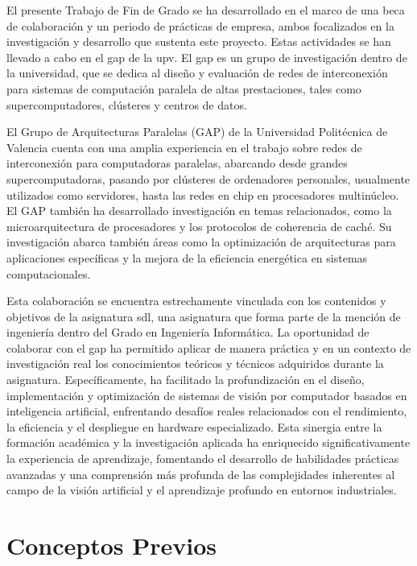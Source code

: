 \documentclass[11pt,spanish,listoffigures,listoftables]{tfgetsinf}
\begin{document}
El presente Trabajo de Fin de Grado se ha desarrollado en el marco de una beca de colaboración y un periodo de prácticas de empresa, ambos focalizados en la investigación y desarrollo que sustenta este proyecto. Estas actividades se han llevado a cabo en el \gls{gap} de la \gls{upv}. El \gls{gap} es un grupo de investigación dentro de la universidad, que se dedica al diseño y evaluación de redes de interconexión para sistemas de computación paralela de altas prestaciones, tales como supercomputadores, clústeres y centros de datos.

El Grupo de Arquitecturas Paralelas (GAP) de la Universidad Politécnica de Valencia cuenta con una amplia experiencia en el trabajo sobre redes de interconexión para computadoras paralelas, abarcando desde grandes supercomputadoras, pasando por clústeres de ordenadores personales, usualmente utilizados como servidores, hasta las redes en chip en procesadores multinúcleo. El GAP también ha desarrollado investigación en temas relacionados, como la microarquitectura de procesadores y los protocolos de coherencia de caché. Su investigación abarca también áreas como la optimización de arquitecturas para aplicaciones específicas y la mejora de la eficiencia energética en sistemas computacionales.

Esta colaboración se encuentra estrechamente vinculada con los contenidos y objetivos de la asignatura \gls{sdl}, una asignatura que forma parte de la mención de ingeniería dentro del Grado en Ingeniería Informática. La oportunidad de colaborar con el \gls{gap} ha permitido aplicar de manera práctica y en un contexto de investigación real los conocimientos teóricos y técnicos adquiridos durante la asignatura. Específicamente, ha facilitado la profundización en el diseño, implementación y optimización de sistemas de visión por computador basados en inteligencia artificial, enfrentando desafíos reales relacionados con el rendimiento, la eficiencia y el despliegue en hardware especializado. Esta sinergia entre la formación académica y la investigación aplicada ha enriquecido significativamente la experiencia de aprendizaje, fomentando el desarrollo de habilidades prácticas avanzadas y una comprensión más profunda de las complejidades inherentes al campo de la visión artificial y el aprendizaje profundo en entornos industriales.


\chapter{Conceptos Previos}\label{chap:conceptos_previos}
\end{document}
